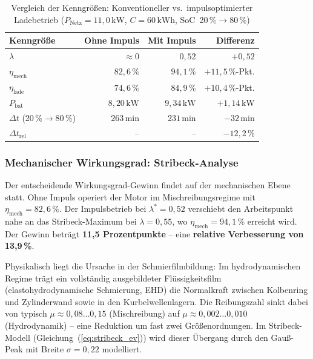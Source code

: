 ﻿\documentclass[a4paper,12pt]{article}
\begin{document}
\begin{table}[htbp]
  \centering
  \caption{Vergleich der Kenngrößen: Konventioneller vs.\ impulsoptimierter Ladebetrieb
           ($P_\text{Netz} = 11{,}0\,\text{kW}$, $C = 60\,\text{kWh}$,
           SoC~20\,\%$\rightarrow$80\,\%)}
  \label{tab:evresults}
  \begin{tabular}{lrrr}
    \toprule
    \textbf{Kenngröße} & \textbf{Ohne Impuls} & \textbf{Mit Impuls} & \textbf{Differenz} \\
    \midrule
    $\lambda$                      & $\approx 0$    & $0{,}52$        & $+0{,}52$               \\
    $\eta_\text{mech}$             & $82{,}6\,\%$   & $94{,}1\,\%$    & $+11{,}5\,\%$-Pkt.      \\
    $\eta_\text{lade}$             & $74{,}6\,\%$   & $84{,}9\,\%$    & $+10{,}4\,\%$-Pkt.      \\
    $P_\text{bat}$                 & $8{,}20\,\text{kW}$ & $9{,}34\,\text{kW}$ & $+1{,}14\,\text{kW}$ \\
    $\Delta t$ (20\,\%$\to$80\,\%) & $263\,\text{min}$ & $231\,\text{min}$ & $-32\,\text{min}$    \\
    $\Delta t_\text{rel}$          & --             & --              & $-12{,}2\,\%$           \\
    \bottomrule
  \end{tabular}
\end{table}

\subsubsection{Mechanischer Wirkungsgrad: Stribeck-Analyse}

Der entscheidende Wirkungsgrad-Gewinn findet auf der mechanischen Ebene statt.
Ohne Impuls operiert der Motor im Mischreibungsregime mit
$\eta_\text{mech} = 82{,}6\,\%$. Der Impulsbetrieb bei $\lambda^* = 0{,}52$
verschiebt den Arbeitspunkt nahe an das Stribeck-Maximum bei $\lambda = 0{,}55$,
wo $\eta_\text{mech} = 94{,}1\,\%$ erreicht wird. Der Gewinn beträgt
\textbf{11,5 Prozentpunkte} -- eine \textbf{relative Verbesserung von 13{,}9\,\%}.

Physikalisch liegt die Ursache in der Schmierfilmbildung: Im hydrodynamischen
Regime trägt ein vollständig ausgebildeter Flüssigkeitsfilm (elastohydrodynamische
Schmierung, EHD) die Normalkraft zwischen Kolbenring und Zylinderwand sowie
in den Kurbelwellenlagern. Die Reibungszahl sinkt dabei von typisch
$\mu \approx 0{,}08\ldots0{,}15$ (Mischreibung) auf
$\mu \approx 0{,}002\ldots0{,}010$ (Hydrodynamik) -- eine Reduktion
um fast zwei Größenordnungen. Im Stribeck-Modell (Gleichung~(\ref{eq:stribeck_ev}))
wird dieser Übergang durch den Gauß-Peak mit Breite $\sigma = 0{,}22$ modelliert.
\end{document}
